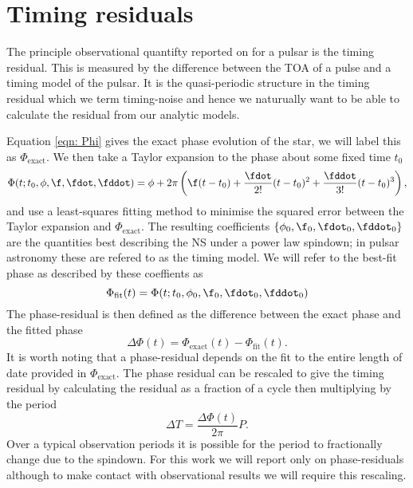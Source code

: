 \documentclass[/home/greg/Thesis/main/main.tex]{subfiles}
\begin{document}
\graphicspath{{/home/greg/Neutron_star_modelling/TimingResiduals/img/}}

\newcommand{\Phiexact}{\Phi_{\mathrm{exact}}}
\newcommand{\Phifit}{\Phi_{\mathrm{fit}}}
\newcommand{\wobbleangle}{\tilde{\theta}}
\FloatBarrier

\section{Timing residuals}
The principle observational quantifty reported on for a pulsar is the timing 
residual. This is measured by the difference between the TOA of a pulse and
a timing model of the pulsar. It is the quasi-periodic structure in
the timing residual which we term timing-noise and hence we naturually want 
to be able to calculate the residual from our analytic models.

Equation \eqref{eqn: Phi} gives the exact phase evolution of the star, we will
label this as $\Phiexact$. We then take a Taylor expansion to the phase
about some fixed time $t_{0}$
\begin{equation}
    \Phi(t; t_{0}, \phi, \f, \fdot, \fddot) = 
    \phi + 2\pi \left(\f(t - t_{0}) + 
                          \frac{\fdot}{2!}(t-t_{0})^{2} +
                          \frac{\fddot}{3!}(t-t_{0})^{3} 
                          \right),
\label{eqn: TR taylor expansion} 
\end{equation}
and use a least-squares fitting method to minimise the squared error between
the Taylor expansion and $\Phiexact$. The resulting coefficients 
$\{\phi_{0}, \f_{0}, \fdot_{0}, \fddot_{0}\}$ are the quantities best describing the
NS under a power law spindown; in pulsar astronomy these are refered to as 
the timing model. We will refer to the best-fit phase as described by  these
coeffients as
\begin{equation}
    \Phifit(t) = \Phi(t; t_{0}, \phi_{0}, \f_{0}, \fdot_{0}, \fddot_{0})
\end{equation}
The phase-residual is then defined as the difference between the exact phase 
and the fitted phase
\begin{equation}
  \Delta\Phi(t) = \Phiexact(t) - \Phifit(t).
\end{equation}
It is worth noting that a phase-residual depends on the fit to the entire
length of date provided in $\Phiexact$. The phase residual can be rescaled to
give the timing residual by calculating the residual as a fraction of a cycle
then multiplying by the period
\begin{equation}
    \Delta T = \frac{\Delta\Phi(t)}{2\pi} P.
    \label{eqn: phase to timing}
\end{equation}
Over a typical observation periods it is possible for the period to
fractionally change due to the spindown. For this work we will report only on
phase-residuals although to make contact with observational results we will
require this rescaling.
\end{document}
